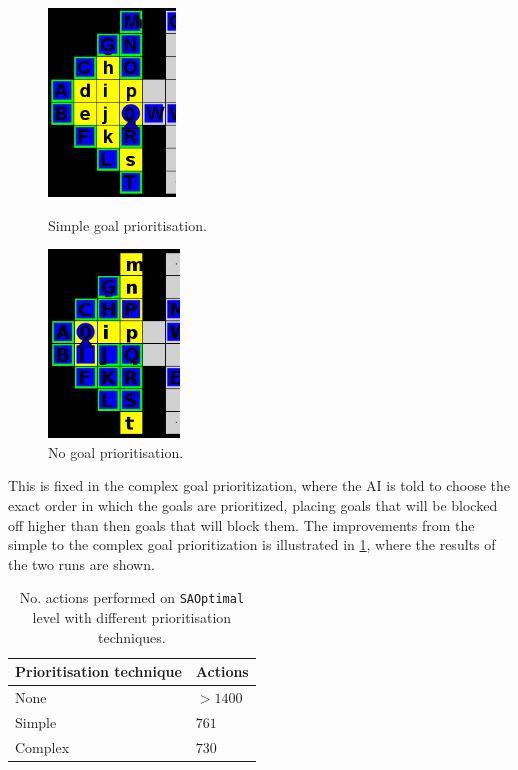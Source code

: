 \begin{figure}[h!]
  \centering
  \begin{minipage}{.45\columnwidth}
    \centering
    \includegraphics[height=5cm]{graphics/simple_priority_block.PNG}
    \caption{\label{fig:simple priority}Simple goal prioritisation.}
  \end{minipage}%
  \hspace{20pt}%
  \begin{minipage}{.45\columnwidth}
    \centering
    \includegraphics[height=5cm]{graphics/no_priority_block.png}
    \caption{\label{fig:no priority}No goal prioritisation.}
  \end{minipage}
\end{figure}

This is fixed in the complex goal prioritization, where the AI is told to choose the exact order in which the goals are prioritized, placing goals that will be blocked off higher than then goals that will block them.  
The improvements from the simple to the complex goal prioritization is illustrated in \cref{tab:SAOptimal_results}, where the results of the two runs are shown.

\begin{table}[h!]
  \centering
  \caption{\label{tab:SAOptimal_results}No. actions performed on \texttt{SAOptimal} level with different prioritisation techniques.}
  \begin{tabular}{@{}ll@{}}
    \toprule
    Prioritisation technique & Actions \\ 
    \midrule
    None    & $>1400$ \\ 
    Simple  & $761$ \\ 
    Complex & $730$ \\
    \bottomrule
  \end{tabular}
\end{table}

